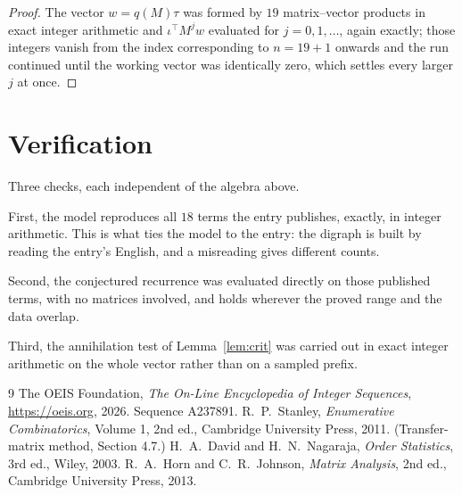 \documentclass[11pt,a4paper]{article}
\theoremstyle{plain}
\theoremstyle{definition}
\begin{document}
\begin{proof}
The vector $w=q(M)\tau$ was formed by $19$ matrix--vector products in exact integer
arithmetic and $\iota^{\!\top}M^{j}w$ evaluated for $j=0,1,\dots$, again exactly; those
integers vanish from the index corresponding to $n=19+1$ onwards and the run continued
until the working vector was identically zero, which settles every larger $j$ at once.
\end{proof}

\section{Verification}

Three checks, each independent of the algebra above.

First, the model reproduces all $18$ terms the entry publishes, exactly, in integer
arithmetic. This is what ties the model to the entry: the digraph is built by reading the
entry's English, and a misreading gives different counts.

Second, the conjectured recurrence was evaluated directly on those published terms, with no
matrices involved, and holds wherever the proved range and the data overlap.

Third, the annihilation test of Lemma~\ref{lem:crit} was carried out in exact integer
arithmetic on the whole vector rather than on a sampled prefix.

\begin{thebibliography}{9}
 The OEIS Foundation, \emph{The On-Line Encyclopedia of Integer
Sequences}, \url{https://oeis.org}, 2026. Sequence A237891.
 R.~P.~Stanley, \emph{Enumerative Combinatorics}, Volume 1, 2nd ed.,
Cambridge University Press, 2011. (Transfer-matrix method, Section 4.7.)
 H.~A.~David and H.~N.~Nagaraja, \emph{Order Statistics}, 3rd ed., Wiley,
2003.
 R.~A.~Horn and C.~R.~Johnson, \emph{Matrix Analysis}, 2nd ed., Cambridge
University Press, 2013.
\end{thebibliography}
\end{document}
